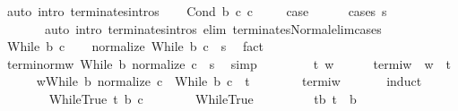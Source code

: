 \begin{isabellebody}
\ {\isacharparenleft}auto\ intro{\isacharcolon}\ terminates{\isachardot}intros{\isacharparenright}\isanewline
{}\isamarkupfalse%
\isanewline
\ \ \isamarkupfalse%
\ {\isacharparenleft}Cond\ b\ c{}\ c{}{\isacharparenright}\ \isanewline
\ \ \isamarkupfalse%
\ {\isacharquery}case\isanewline
\ \ \ \ \isamarkupfalse%
\ {\isacharparenleft}cases\ s{\isacharparenright}\isanewline
\ \ \ \ \ \ \ {\isacharparenleft}auto\ intro{\isacharcolon}\ terminates{\isachardot}intros\ elim{\isacharbang}{\isacharcolon}\ terminates{\isacharunderscore}Normal{\isacharunderscore}elim{\isacharunderscore}cases{\isacharparenright}\isanewline
{}\isamarkupfalse%
\isanewline
\ \ \isamarkupfalse%
\ {\isacharparenleft}While\ b\ c{\isacharparenright}\isanewline
\ \ \isamarkupfalse%
\ {\isachardoublequoteopen}{\isasymGamma}{\isasymturnstile}normalize\ {\isacharparenleft}While\ b\ c{\isacharparenright}\ {\isasymdown}\ s{\isachardoublequoteclose}\ \isamarkupfalse%
\ fact\isanewline
\ \ \isamarkupfalse%
\ termi{\isacharunderscore}norm{\isacharunderscore}w{\isacharcolon}\ {\isachardoublequoteopen}{\isasymGamma}{\isasymturnstile}While\ b\ {\isacharparenleft}normalize\ c{\isacharparenright}\ {\isasymdown}\ s{\isachardoublequoteclose}\ \isamarkupfalse%
\ simp\isanewline
\ \ \isacommand{{\isacharbraceleft}}\isamarkupfalse%
\isanewline
\ \ \ \ \isamarkupfalse%
\ t\ w\isanewline
\ \ \ \ \isamarkupfalse%
\ termi{\isacharunderscore}w{\isacharcolon}\ {\isachardoublequoteopen}{\isasymGamma}{\isasymturnstile}\ w\ {\isasymdown}\ t{\isachardoublequoteclose}\isanewline
\ \ \ \ \isamarkupfalse%
\ {\isachardoublequoteopen}w{\isacharequal}While\ b\ {\isacharparenleft}normalize\ c{\isacharparenright}\ {\isasymLongrightarrow}\ {\isasymGamma}{\isasymturnstile}While\ b\ c\ {\isasymdown}\ t{\isachardoublequoteclose}\isanewline
\ \ \ \ \ \ \isamarkupfalse%
\ termi{\isacharunderscore}w\ \isanewline
\ \ \ \ \isamarkupfalse%
\ {\isacharparenleft}induct{\isacharparenright}\isanewline
\ \ \ \ \ \ \isamarkupfalse%
\ {\isacharparenleft}WhileTrue\ t{\isacharprime}\ b{\isacharprime}\ c{\isacharprime}{\isacharparenright}\isanewline
\ \ \ \ \ \ \isamarkupfalse%
\ WhileTrue\ \isamarkupfalse%
\isanewline
\ \ \ \ \ \ \ \ t{\isacharprime}{\isacharunderscore}b{\isacharcolon}\ {\isachardoublequoteopen}t{\isacharprime}\ {\isasymin}\ b{\isachardoublequoteclose}\ \isanewline

\end{isabellebody}
